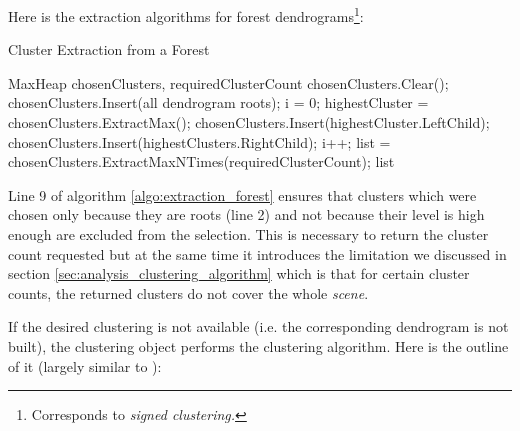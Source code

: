 Here is the extraction algorithms for forest dendrograms\footnote{Corresponds to {\it signed clustering.}}:

\begin{algorithm}[H]
\caption{Cluster Extraction from a Forest}
\label{algo:extraction_forest}
\begin{algorithmic}[1]

\Require MaxHeap chosenClusters, requiredClusterCount
\Statex
\State chosenClusters.Clear();
\State chosenClusters.Insert(all dendrogram roots);
\State i = 0;
	\State highestCluster = chosenClusters.ExtractMax();
    \State chosenClusters.Insert(highestCluster.LeftChild);
    \State chosenClusters.Insert(highestClusters.RightChild);
    \State i++;
\EndWhile
\State list = chosenClusters.ExtractMaxNTimes(requiredClusterCount);
\Statex
\Return list
\end{algorithmic}
\end{algorithm}

Line 9 of algorithm \ref{algo:extraction_forest} ensures that clusters which were chosen only because they are roots (line 2) and not because their level is high enough are excluded from the selection. This is necessary to return the cluster count requested but at the same time it introduces the limitation we discussed in section \ref{sec:analysis_clustering_algorithm} which is that for certain cluster counts, the returned clusters do not cover the whole {\it scene}.

If the desired clustering is not available (i.e. the corresponding dendrogram is not built), the clustering object performs the clustering algorithm. Here is the outline of it (largely similar to \citet{Telea99}):

